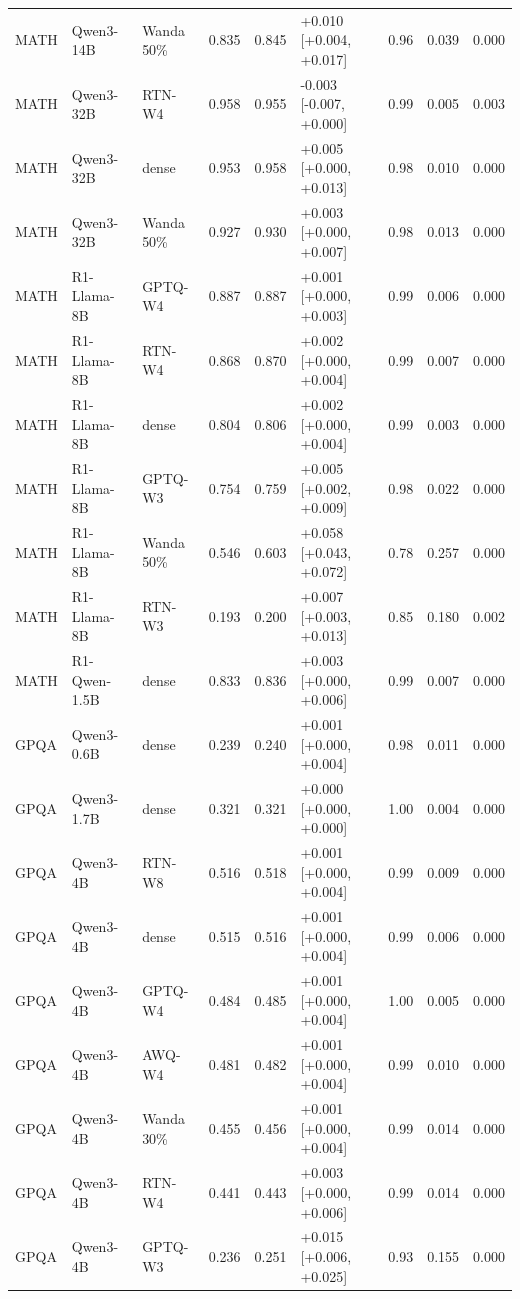\begin{tabular}{lllrrlrrr}
MATH & Qwen3-14B & Wanda 50\% & 0.835 & 0.845 & +0.010 [+0.004, +0.017] & 0.96 & 0.039 & 0.000 \\
MATH & Qwen3-32B & RTN-W4 & 0.958 & 0.955 & -0.003 [-0.007, +0.000] & 0.99 & 0.005 & 0.003 \\
MATH & Qwen3-32B & dense & 0.953 & 0.958 & +0.005 [+0.000, +0.013] & 0.98 & 0.010 & 0.000 \\
MATH & Qwen3-32B & Wanda 50\% & 0.927 & 0.930 & +0.003 [+0.000, +0.007] & 0.98 & 0.013 & 0.000 \\
MATH & R1-Llama-8B & GPTQ-W4 & 0.887 & 0.887 & +0.001 [+0.000, +0.003] & 0.99 & 0.006 & 0.000 \\
MATH & R1-Llama-8B & RTN-W4 & 0.868 & 0.870 & +0.002 [+0.000, +0.004] & 0.99 & 0.007 & 0.000 \\
MATH & R1-Llama-8B & dense & 0.804 & 0.806 & +0.002 [+0.000, +0.004] & 0.99 & 0.003 & 0.000 \\
MATH & R1-Llama-8B & GPTQ-W3 & 0.754 & 0.759 & +0.005 [+0.002, +0.009] & 0.98 & 0.022 & 0.000 \\
MATH & R1-Llama-8B & Wanda 50\% & 0.546 & 0.603 & +0.058 [+0.043, +0.072] & 0.78 & 0.257 & 0.000 \\
MATH & R1-Llama-8B & RTN-W3 & 0.193 & 0.200 & +0.007 [+0.003, +0.013] & 0.85 & 0.180 & 0.002 \\
MATH & R1-Qwen-1.5B & dense & 0.833 & 0.836 & +0.003 [+0.000, +0.006] & 0.99 & 0.007 & 0.000 \\
GPQA & Qwen3-0.6B & dense & 0.239 & 0.240 & +0.001 [+0.000, +0.004] & 0.98 & 0.011 & 0.000 \\
GPQA & Qwen3-1.7B & dense & 0.321 & 0.321 & +0.000 [+0.000, +0.000] & 1.00 & 0.004 & 0.000 \\
GPQA & Qwen3-4B & RTN-W8 & 0.516 & 0.518 & +0.001 [+0.000, +0.004] & 0.99 & 0.009 & 0.000 \\
GPQA & Qwen3-4B & dense & 0.515 & 0.516 & +0.001 [+0.000, +0.004] & 0.99 & 0.006 & 0.000 \\
GPQA & Qwen3-4B & GPTQ-W4 & 0.484 & 0.485 & +0.001 [+0.000, +0.004] & 1.00 & 0.005 & 0.000 \\
GPQA & Qwen3-4B & AWQ-W4 & 0.481 & 0.482 & +0.001 [+0.000, +0.004] & 0.99 & 0.010 & 0.000 \\
GPQA & Qwen3-4B & Wanda 30\% & 0.455 & 0.456 & +0.001 [+0.000, +0.004] & 0.99 & 0.014 & 0.000 \\
GPQA & Qwen3-4B & RTN-W4 & 0.441 & 0.443 & +0.003 [+0.000, +0.006] & 0.99 & 0.014 & 0.000 \\
GPQA & Qwen3-4B & GPTQ-W3 & 0.236 & 0.251 & +0.015 [+0.006, +0.025] & 0.93 & 0.155 & 0.000 \\

\end{tabular}
